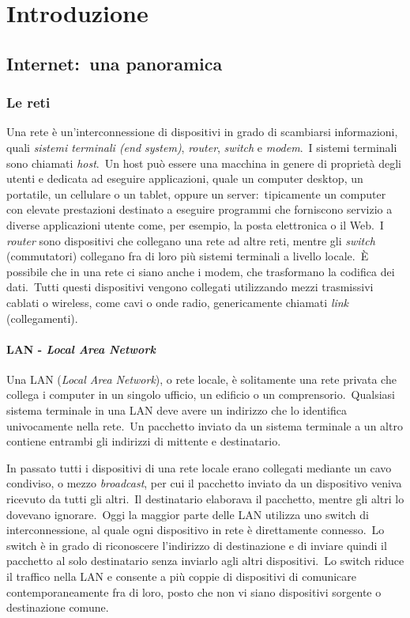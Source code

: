 \chapter{Introduzione}

\section{Internet:\ una panoramica}

\subsection{Le reti}

Una rete è un'interconnessione di dispositivi in grado di scambiarsi informazioni, quali \emph{sistemi terminali (end system)}, \emph{router}, \emph{switch} e \emph{modem}.\
I sistemi terminali sono chiamati \emph{host}.\
Un host può essere una macchina in genere di proprietà degli utenti e dedicata ad eseguire applicazioni, quale un computer desktop, un portatile, un cellulare o un tablet, oppure un server:\ tipicamente un computer con elevate prestazioni destinato a eseguire programmi che forniscono servizio a diverse applicazioni utente come, per esempio, la posta elettronica o il Web.\
I \emph{router} sono dispositivi che collegano una rete ad altre reti, mentre gli \emph{switch} (commutatori) collegano fra di loro più sistemi terminali a livello locale.\
È possibile che in una rete ci siano anche i modem, che trasformano la codifica dei dati.\
Tutti questi dispositivi vengono collegati utilizzando mezzi trasmissivi cablati o wireless, come cavi o onde radio, genericamente chiamati \emph{link} (collegamenti).

\subsubsection{LAN - \emph{Local Area Network}}

Una LAN (\emph{Local Area Network}), o rete locale, è solitamente una rete privata che collega i computer in un singolo ufficio, un edificio o un comprensorio.\
Qualsiasi sistema terminale in una LAN deve avere un indirizzo che lo identifica univocamente nella rete.\
Un pacchetto inviato da un sistema terminale a un altro contiene entrambi gli indirizzi di mittente e destinatario.

In passato tutti i dispositivi di una rete locale erano collegati mediante un cavo condiviso, o mezzo \emph{broadcast}, per cui il pacchetto inviato da un dispositivo veniva ricevuto da tutti gli altri.\
Il destinatario elaborava il pacchetto, mentre gli altri lo dovevano ignorare.\
Oggi la maggior parte delle LAN utilizza uno switch di interconnessione, al quale ogni dispositivo in rete è direttamente connesso.\
Lo switch è in grado di riconoscere l'indirizzo di destinazione e di inviare quindi il pacchetto al solo destinatario senza inviarlo agli altri dispositivi.\
Lo switch riduce il traffico nella LAN e consente a più coppie di dispositivi di comunicare contemporaneamente fra di loro, posto che non vi siano dispositivi sorgente o destinazione comune.

